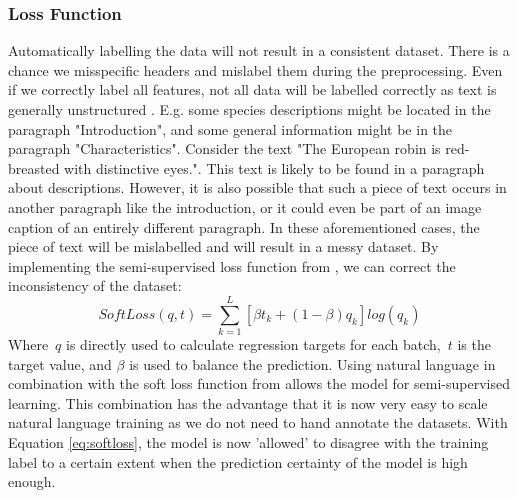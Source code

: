 \documentclass[a4paper, 12pt, oneside]{book} %
\begin{document}

\subsubsection{Loss Function}
Automatically labelling the data will not result in a consistent dataset.
There is a chance we misspecific headers and mislabel them during the preprocessing.
Even if we correctly label all features, not all data will be labelled correctly as text is generally unstructured \autocite{kumar_text_2020}.
E.g. some species descriptions might be located in the paragraph "Introduction", and some general information might be in the paragraph "Characteristics".
Consider the text "The European robin is red-breasted with distinctive eyes.".
This text is likely to be found in a paragraph about descriptions.
However, it is also possible that such a piece of text occurs in another paragraph like the introduction, or it could even be part of an image caption of an entirely different paragraph. 
In these aforementioned cases, the piece of text will be mislabelled and will result in a messy dataset.
By implementing the semi-supervised loss function from \textcite{reed_training_2015}, we can correct the inconsistency of the dataset:
\begin{equation} \label{eq:softloss}
 SoftLoss(q, t) = \sum_{k=1}^{L}[\beta t _k + (1- \beta )q _k]log(q _k)
\end{equation}
Where~$q$ is directly used to calculate regression targets for each batch,~$t$ is the target value, and \(\beta\) is used to balance the prediction.
Using natural language in combination with the soft loss function from \textcite{reed_training_2015} allows the model for semi-supervised learning.
This combination has the advantage that it is now very easy to scale natural language training as we do not need to hand annotate the datasets.
With Equation \ref{eq:softloss}, the model is now 'allowed' to disagree with the training label to a certain extent when the prediction certainty of the model is high enough.
\end{document}
